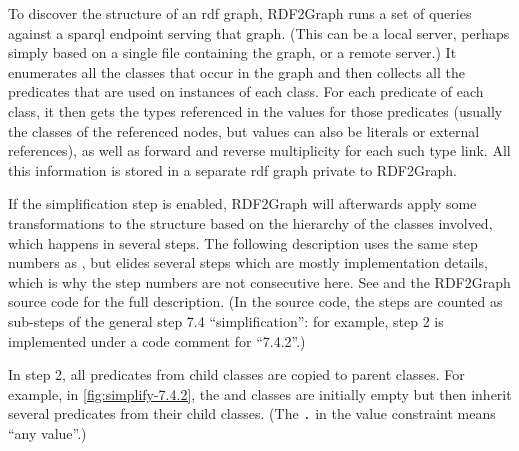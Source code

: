 To discover the structure of an \gls{rdf} graph,
\gls{RDF2Graph} runs a set of queries against a \gls{sparql} endpoint serving that graph.
(This can be a local server, perhaps simply based on a single file containing the graph,
or a remote server.)
It enumerates all the classes that occur in the graph
and then collects all the \glspl{predicate} that are used on instances of each class.
For each \gls{predicate} of each class,
it then gets the types referenced in the values for those \glspl{predicate}
(usually the classes of the referenced nodes,
but values can also be literals or external references),
as well as forward and reverse multiplicity for each such type link.
All this information is stored in a separate \gls{rdf} graph private to \gls{RDF2Graph}.

If the simplification step is enabled,
\gls{RDF2Graph} will afterwards apply some transformations to the structure
based on the hierarchy of the classes involved,
which happens in several steps.
The following description uses the same step numbers as \cite{vanDam2015},
but elides several steps which are mostly implementation details,
which is why the step numbers are not consecutive here.
See \cite{vanDam2015} and the \gls{RDF2Graph} source code for the full description.
(In the source code, the steps are counted as sub-steps of the general step 7.4 “simplification”:
for example, step 2 is implemented under a code comment for “7.4.2”.)


In step 2, all \glspl{predicate} from child classes are copied to parent classes.
For example, in \cref{fig:simplify-7.4.2},
the  and  classes are initially empty
but then inherit several \glspl{predicate} from their child classes.
(The \lstinline{.} in the  \gls{value constraint} means “any value”.)

